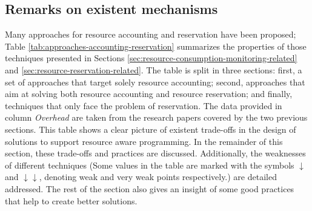 \subsection{Remarks on existent mechanisms} \label{sec:discussion-related-work}

Many approaches for resource accounting and reservation have been proposed; Table \ref{tab:approaches-accounting-reservation} summarizes the properties of those techniques presented in Sections \ref{sec:resource-consumption-monitoring-related} and \ref{sec:resource-reservation-related}.
The table is split in three sections: first, a set of approaches that target solely resource accounting; second, approaches that aim at solving both resource accounting and resource reservation; and finally, techniques that only face the problem of reservation.
The data provided in column \textit{Overhead} are taken from the research papers covered by the two previous sections.
This table shows a clear picture of existent trade-offs in the design of solutions to support resource aware programming.
In the remainder of this section, these trade-offs and practices are discussed.
Additionally, the weaknesses of different techniques (Some values in the table are marked with the symbols $ \downarrow $ and $\downarrow\downarrow$, denoting weak and very weak points respectively.) are detailed addressed.
The rest of the section also gives an insight of some good practices that help to create better solutions.

\newcommand{\weakp}{$\downarrow \downarrow$}
\newcommand{\weak}{$\downarrow$}

